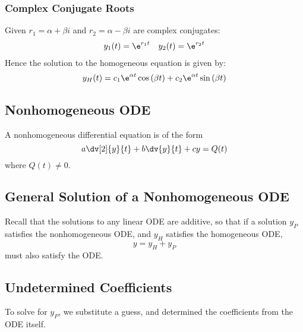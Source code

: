 \documentclass{article}
\begin{document}
\subsubsection{Complex Conjugate Roots}
Given $r_1 = \alpha + \beta i$ and $r_2 = \alpha - \beta i$ are complex conjugates:
\begin{align*}
    y_1(t) = \e^{r_1t} &  & y_2(t) = \e^{r_2t}
\end{align*}
Hence the solution to the homogeneous equation is given by:
\begin{equation*}
    y_H(t) = c_1\e^{\alpha t}\cos{\left( \beta t \right)} + c_2\e^{\alpha t}\sin{\left( \beta t \right)}
\end{equation*}
\subsection{Nonhomogeneous ODE}
A nonhomogeneous differential equation is of the form
\begin{equation*}
    a \dv[2]{y}{t} + b \dv{y}{t} + c y = Q(t)
\end{equation*}
where $Q(t)\neq 0$.
\subsection{General Solution of a Nonhomogeneous ODE}
Recall that the solutions to any linear ODE are additive, so that if a solution $y_P$ satisfies
the nonhomogeneous ODE, and $y_H$ satisfies the homogeneous ODE,
\begin{equation*}
    y = y_H + y_P
\end{equation*}
must also satisfy the ODE.
\subsection{Undetermined Coefficients}
To solve for $y_P$, we substitute a guess, and
determined the coefficients from the ODE itself.
\end{document}
